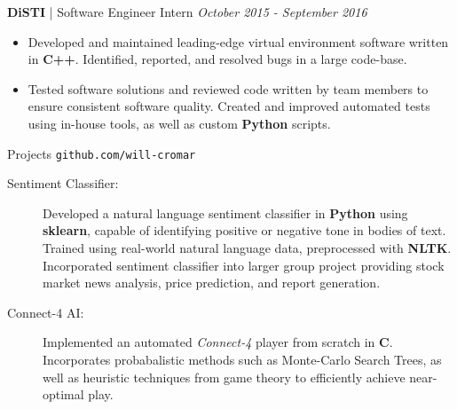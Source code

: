 \documentclass[letterpaper,11pt,oneside]{article}
\newcommand{\resheader}[2][]{
  \vspace{9pt}
  {\LARGE #2} #1
  \\
}
\newcommand{\ressubheader}[3][]{
  \vspace{6pt}
  {\large \textbf{#2} #1} \hfill \emph{#3}
  \\
}
\newcommand{\resskill}[1]{\textbf{#1}}
\begin{document}
\ressubheader[| Software Engineer Intern]{DiSTI}{October 2015 - September 2016}
\begin{itemize}
  \item Developed and maintained leading-edge virtual environment software written in \resskill{C++}. Identified, reported, and resolved bugs in a large code-base.
  \item Tested software solutions and reviewed code written by team members to ensure consistent software quality. Created and improved automated tests using in-house tools, as well as custom \resskill{Python} scripts.
\end{itemize}

\resheader[\hfill \texttt{github.com/will-cromar}]{Projects}
\begin{description}
  \item [Sentiment Classifier:] Developed a natural language sentiment classifier in \resskill{Python} using \resskill{sklearn}, capable of identifying positive or negative tone in bodies of text. Trained using real-world natural language data, preprocessed with \resskill{NLTK}. Incorporated sentiment classifier into larger group project providing stock market news analysis, price prediction, and report generation.
  \item [Connect-4 AI:] Implemented an automated \emph{Connect-4} player from scratch in \resskill{C}. Incorporates probabalistic methods such as Monte-Carlo Search Trees, as well as heuristic techniques from game theory to efficiently achieve near-optimal play.
\end{description}    
\end{document}
